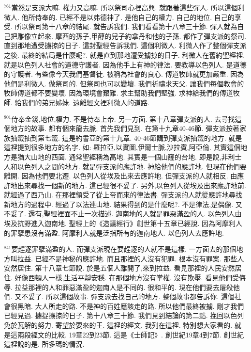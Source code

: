 \documentclass{book}
\begin{document}
$^{761}$當然是支派大嘛.
權力又高嘛.
所以祭司心裡高興.
就跟著這些彈人.
所以這個利微人.
他所侍奉的.
已經不是以弗德神了.
是他自己的權力.
自己的地位.
自己的享受.
所以祭司第十八章的結尾.
就告訴我們.
我們看看第十八章三十節.
彈人就為自己把雕像立起來.
摩西的孫子,甲醇的兒子約拿丹和他的子孫.
都作了彈支派的祭司.
直到那地遭受擄掠的日子.
這封聖經告訴我們.
這個利微人.
利微人作了整個彈支派之後.
最終的結局是什麼呢?.
就是直到那地遭受擄掠的日子.
利微人在舊約聖經裡.
就是以色列人社會的道德守護者.
因為他手上有神的律法.
要教導以色列人.
是道德的守護者.
有些像今天我們基督徒.
被稱為社會的良心.
傳道牧師就更加嚴重.
因為他們是利微人.
做祭司的.
但祭司也可以變壞.
我們祈禱求天父.
讓我們每個教會的牧師傳道都不要變壞.
因為環境會艱難.
求主幫助我們堅強.
求神給我們的傳道牧師.
給我們的弟兄姊妹.
遠離經文裡利微人的道路.

$^{801}$侍奉金錢,地位,權力.
不是侍奉上帝.
另一方面.
第十八章彈支派的人.
去尋找這個地方的故事.
都有個來龍去脈.
首先我們見到.
在第十九章40-46節.
彈支派按著家族抽籤抽到第七籤.
這是約書亞的第十九章.
40-46節講到彈支派抽籤的地方.
就是這裡提到很多地方的名字.
如: 羅拉亞,以實圖,伊爾士脈,沙拉賓,阿亞倫.
其實這個地方是猶大山地的西面.
通常聖經稱為高地.
其實是一個山窿的台地.
即是說,非利士人和以色列人之間的地方.
就是彈支派的應許地.
神給他們的應許地.
但現在他們要離開.
因為他們要北遷.
以色列人從埃及出來去應許地.
但彈支派的人就相反.
由應許地出來尋找一個新的地方.
這已經很不妥了.
另外,以色列人從埃及出來應許地前.
就經過了西乃山.
在那裡領受了從上帝而來的律法書.
彈支派的人就從應許地尋找新地方的過程中.
經過了以法連山地.
結果得到的是什麼呢?.
不是律法,是偶像.
又不妥了.
還有,聖經裡面不止一次描述.
迦南地的人就是罪惡滿盈的人.
以色列人由埃及抗野進入迦南地.
聖經上的《造議經行》創世第十五章已經說.
因為阿摩利人的罪孽患沒有滿盈.
阿摩利人就是泛指所有的迦南地人.
以色列人去應許地.

$^{841}$要趕逐罪孽滿盈的人.
而彈支派現在要趕逐的人就不是這樣.
一方面去的那個地方叫拉益.
已經不是神秘的應許地.
而且那裡的人沒有犯罪.
根本沒有罪案.
那些人安然居住.
第十八章七節說.
於是五個人離開了,來到拉益.
看見那裡的人民安然居住.
好像西頓人一樣,生活平靜安穩.
在那個地方沒有掌權.
沒有欺壓.
看見他們受侮辱.
拉益那裡的人和罪惡滿盈的迦南人是不同的.
很和平的.
現在他們要去屠殺他們.
又不妥了.
所以這個故事.
彈支派去找自己的地方.
整個故事都告訴你.
這個社會很黑暗.
大人所走的路.
不是神的百姓應該走的路.
所以他們最終被擄.
剛才我們已經見過.
擄捉擄掠的日子.
第十八章三十節.
我們見到結論的第二點.
挽回以色列免於瓦解的努力.
寄望於要來的王.
這裡的經文.
我列在這裡.
特別想大家看的.
就是這兩段經文的比較.
19章22到23節.
這是《士師記》.
創世紀19章4到7節.
創世紀這裡說的是.
所多瑪的情況.
\end{document}

